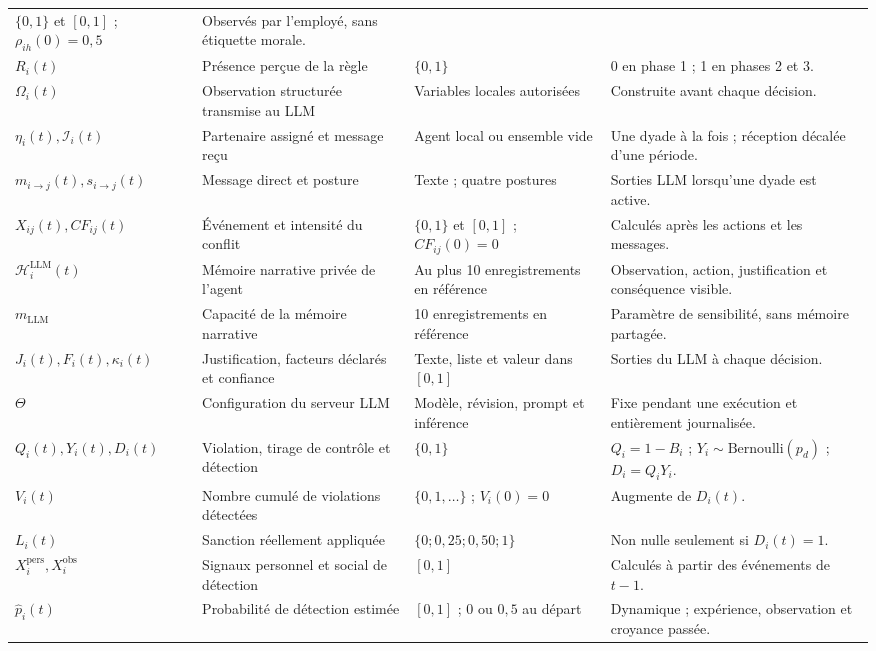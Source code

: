 \documentclass[10pt,a4paper]{article}
\begin{document}
\begin{longtable}{@{}L{27mm}L{48mm}L{38mm}L{44mm}@{}}
$\{0,1\}$ et $[0,1]$ ; $\rho_{ih}(0)=0{,}5$ &
Observés par l’employé, sans étiquette morale.\\
$R_i(t)$ &
Présence perçue de la règle &
$\{0,1\}$ &
0 en phase 1 ; 1 en phases 2 et 3.\\
$\Omega_i(t)$ &
Observation structurée transmise au LLM &
Variables locales autorisées &
Construite avant chaque décision.\\
$\eta_i(t),\mathcal I_i(t)$ &
Partenaire assigné et message reçu &
Agent local ou ensemble vide &
Une dyade à la fois ; réception décalée d’une période.\\
$m_{i\rightarrow j}(t),s_{i\rightarrow j}(t)$ &
Message direct et posture &
Texte ; quatre postures &
Sorties LLM lorsqu’une dyade est active.\\
$X_{ij}(t),CF_{ij}(t)$ &
Événement et intensité du conflit &
$\{0,1\}$ et $[0,1]$ ; $CF_{ij}(0)=0$ &
Calculés après les actions et les messages.\\
$\mathcal H_i^{\mathrm{LLM}}(t)$ &
Mémoire narrative privée de l’agent &
Au plus 10 enregistrements en référence &
Observation, action, justification et conséquence visible.\\
$m_{\mathrm{LLM}}$ &
Capacité de la mémoire narrative &
10 enregistrements en référence &
Paramètre de sensibilité, sans mémoire partagée.\\
$J_i(t),F_i(t),\kappa_i(t)$ &
Justification, facteurs déclarés et confiance &
Texte, liste et valeur dans $[0,1]$ &
Sorties du LLM à chaque décision.\\
$\Theta$ &
Configuration du serveur LLM &
Modèle, révision, prompt et inférence &
Fixe pendant une exécution et entièrement journalisée.\\
$Q_i(t),Y_i(t),D_i(t)$ &
Violation, tirage de contrôle et détection &
$\{0,1\}$ &
$Q_i=1-B_i$ ; $Y_i\sim\mathrm{Bernoulli}(p_d)$ ;
$D_i=Q_iY_i$.\\
$V_i(t)$ &
Nombre cumulé de violations détectées &
$\{0,1,\ldots\}$ ; $V_i(0)=0$ &
Augmente de $D_i(t)$.\\
$L_i(t)$ &
Sanction réellement appliquée &
$\{0;0{,}25;0{,}50;1\}$ &
Non nulle seulement si $D_i(t)=1$.\\
$X_i^{\mathrm{pers}},X_i^{\mathrm{obs}}$ &
Signaux personnel et social de détection &
$[0,1]$ &
Calculés à partir des événements de $t-1$.\\
$\widehat p_i(t)$ &
Probabilité de détection estimée &
$[0,1]$ ; 0 ou $0{,}5$ au départ &
Dynamique ; expérience, observation et croyance passée.\\

\end{longtable}
\end{document}
